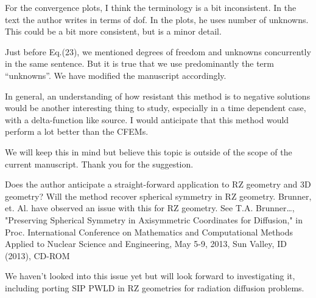\documentclass{article}
\begin{document}
\bigskip




{
\color{blue}
For the convergence plots, I think the terminology is a bit inconsistent. In the text the author writes
in terms of dof. In the plots, he uses number of unknowns. This could be a bit more consistent, but is a
minor detail.
}

Just before Eq.(23), we mentioned degrees of freedom and unknowns concurrently in the same sentence. But it is true
that we use predominantly the term ``unknowns''. We have modified the manuscript accordingly.

\bigskip


{
\color{blue}
In general, an understanding of how resistant this method is to negative solutions would be another
interesting thing to study, especially in a time dependent case, with a delta-function like source. I would
anticipate that this method would perform a lot better than the CFEMs.
}

We will keep this in mind but believe this topic is outside of the scope of the current manuscript. Thank you
for the suggestion.
\bigskip



{
\color{blue}
Does the author anticipate a straight-forward application to RZ geometry and 3D geometry? Will the
method recover spherical symmetry in RZ geometry. Brunner, et. Al. have observed an issue with this for RZ
geometry. See T.A. Brunner…, "Preserving Spherical Symmetry in Axisymmetric Coordinates for Diffusion,"
in Proc. International Conference on Mathematics and Computational Methods Applied to Nuclear Science and
Engineering, May 5-9, 2013, Sun Valley, ID (2013), CD-ROM
}

We haven't looked into this issue yet but will look forward to investigating it, including porting SIP PWLD in RZ geometries
for radiation diffusion problems.
\bigskip
\end{document}
